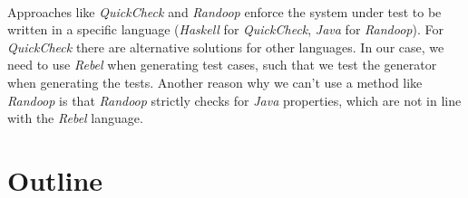 \\
Approaches like \textit{QuickCheck} \cite{claessen2011quickcheck} and \textit{Randoop} \cite{pacheco2007randoop} enforce the system under test to be written in a specific language (\textit{Haskell} for \textit{QuickCheck}, \textit{Java} for \textit{Randoop}). For \textit{QuickCheck} there are alternative solutions for other languages. In our case, we need to use \textit{Rebel} when generating test cases, such that we test the generator when generating the tests. Another reason why we can't use a method like \textit{Randoop} is that \textit{Randoop} strictly checks for \textit{Java} properties, which are not in line with the \textit{Rebel} language.

\section{Outline}

